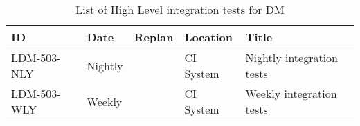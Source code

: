 \begin{longtable} {llllp{}}
\caption{List of High Level integration tests for DM \label{tab:schedule}} \\ %
\toprule
\textbf{ID} & \textbf{Date} & \textbf{Replan} & \textbf{Location} & \textbf{Title} \\ \toprule

LDM-503-NLY &
Nightly &
	&
CI System &
Nightly integration tests \\

LDM-503-WLY &
Weekly &
	&
CI System &
Weekly integration tests \\


\bottomrule

\end{longtable}
